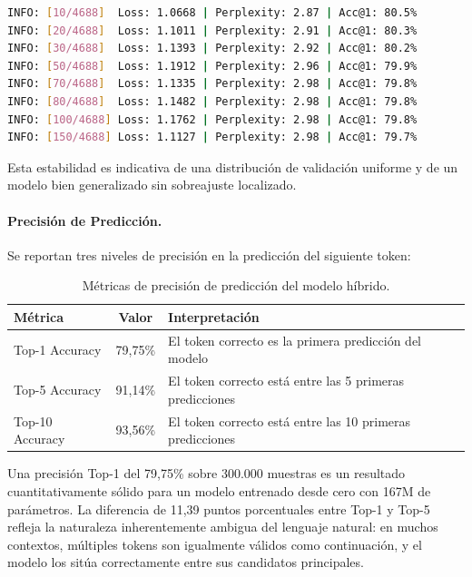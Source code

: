 \begin{lstlisting}[language=bash, caption={Extracto de \texttt{log\_benchmark.log}: estabilización de perplejidad a partir del batch 70.}]
INFO: [10/4688]  Loss: 1.0668 | Perplexity: 2.87 | Acc@1: 80.5%
INFO: [20/4688]  Loss: 1.1011 | Perplexity: 2.91 | Acc@1: 80.3%
INFO: [30/4688]  Loss: 1.1393 | Perplexity: 2.92 | Acc@1: 80.2%
INFO: [50/4688]  Loss: 1.1912 | Perplexity: 2.96 | Acc@1: 79.9%
INFO: [70/4688]  Loss: 1.1335 | Perplexity: 2.98 | Acc@1: 79.8%
INFO: [80/4688]  Loss: 1.1482 | Perplexity: 2.98 | Acc@1: 79.8%
INFO: [100/4688] Loss: 1.1762 | Perplexity: 2.98 | Acc@1: 79.8%
INFO: [150/4688] Loss: 1.1127 | Perplexity: 2.98 | Acc@1: 79.7%
\end{lstlisting}

Esta estabilidad es indicativa de una distribución de validación uniforme y de un modelo bien generalizado sin sobreajuste localizado.

\paragraph{Precisión de Predicción.}
Se reportan tres niveles de precisión en la predicción del siguiente token:

\begin{table}[H]
\centering
\begin{tabularx}{\textwidth}{|l|c|X|}
\hline
\textbf{Métrica} & \textbf{Valor} & \textbf{Interpretación} \\ \hline
Top-1 Accuracy & 79,75\% & El token correcto es la primera predicción del modelo \\ \hline
Top-5 Accuracy & 91,14\% & El token correcto está entre las 5 primeras predicciones \\ \hline
Top-10 Accuracy & 93,56\% & El token correcto está entre las 10 primeras predicciones \\ \hline
\end{tabularx}
\caption{Métricas de precisión de predicción del modelo híbrido.}
\label{tab:accuracy}
\end{table}

Una precisión Top-1 del 79,75\% sobre 300.000 muestras es un resultado cuantitativamente sólido para un modelo entrenado desde cero con 167M de parámetros. La diferencia de 11,39 puntos porcentuales entre Top-1 y Top-5 refleja la naturaleza inherentemente ambigua del lenguaje natural: en muchos contextos, múltiples tokens son igualmente válidos como continuación, y el modelo los sitúa correctamente entre sus candidatos principales.

